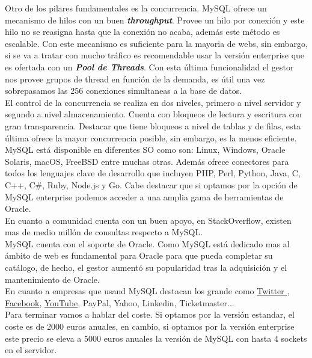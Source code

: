 \documentclass{article}
\begin{document}
Otro de los pilares fundamentales es la concurrencia. MySQL ofrece un mecanismo de hilos con un buen \textbf{\emph{throughput}}. Provee un hilo por conexión y este hilo no se reasigna hasta que la conexión no acaba, además este método es escalable. Con este mecanismo es suficiente para la mayoria de webs, sin embargo, si se va a tratar con mucho tráfico es recomendable usar la versión enterprise que es ofertada con un \textbf{\emph{Pool de Threads}}. Con esta última funcionalidad el gestor nos provee grupos de thread en función de la demanda, es útil una vez sobrepasamos las 256 conexiones simultaneas a la base de datos.\\
El control de la concurrencia se realiza en dos niveles, primero a nivel servidor y segundo a nivel almacenamiento. Cuenta con bloqueos de lectura y escritura con gran transparencia. Destacar que tiene bloqueos a nivel de tablas y de filas, esta última ofrece la mayor concurrencia posible, sin embargo, es la menos eficiente. \cite{enterprise}\\

MySQL está disponible en diferentes SO como son: Linux, Windows, Oracle Solaris,  macOS, FreeBSD entre muchas otras.
Además ofrece conectores para todos los lenguajes clave de desarrollo que incluyen PHP, Perl, Python, Java, C, C++, C\#, Ruby, Node.js y Go. Cabe destacar que si optamos por la opción de MySQL enterprise podemos acceder a una amplia gama de herramientas de Oracle. \\
En cuanto a comunidad cuenta con un buen apoyo, en StackOverflow, existen mas de medio millón de consultas respecto a MySQL.\\
MySQL cuenta con el soporte de Oracle. Como MySQL está dedicado mas al ámbito de web es fundamental para Oracle para que pueda completar su catálogo, de hecho, el gestor aumentó su popularidad tras la adquisición y el mantenimiento de Oracle.\\

En cuanto a empresas que usand MySQL destacan los grande como
 \href{https://blog.twitter.com/engineering/en_us/a/2013/new-tweets-per-second-record-and-how.html}{Twitter }, 
\href{https://www.theregister.co.uk/2013/06/27/facebook_tao/}{Facebook},
 \href{http://highscalability.com/blog/2012/3/26/7-years-of-youtube-scalability-lessons-in-30-minutes.html}{YouTube},
  PayPal, Yahoo, Linkedin, Ticketmaster...\\
  
Para terminar vamos a hablar del coste. Si optamos por la versión estandar, el coste es de 2000 euros anuales, en cambio, si optamos por la versión enterprise este precio se eleva a 5000 euros anuales la versión de MySQL con hasta 4 sockets en el servidor.\cite{precios}\\
\end{document}

